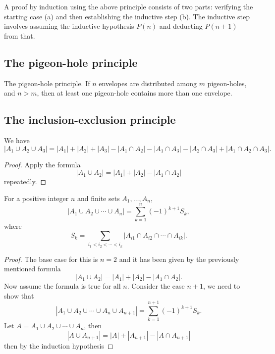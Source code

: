 \documentclass[10pt, a4paper]{article}
\begin{document}
A proof by induction using the above principle consists of two parts:
verifying the starting case (a) and then establishing the inductive step (b).
The inductive step involves assuming the inductive hypothesis $P(n)$ and deducting $P(n + 1)$ from that.

\subsection{The pigeon-hole principle}
The pigeon-hole principle.
If $n$ envelopes are distributed among $m$ pigeon-holes,
and $n > m$,
then at least one pigeon-hole contains more than one envelope.



\subsection{The inclusion-exclusion principle}

\begin{proposition}
    We have
    \[
    |A_1 \cup A_2 \cup A_3| = |A_1| + |A_2| + |A_3| - |A_1 \cap A_2| - |A_1 \cap A_3| - |A_2 \cap A_3| + |A_1 \cap A_2 \cap A_3|.
    \]
    \begin{proof}
        Apply the formula
        \[
        |A_1 \cup A_2| = |A_1| + |A_2| - |A_1 \cap A_2|
        \]
        repeatedly.
    \end{proof}
\end{proposition}

\begin{theorem}
    For a positive integer $n$ and finite sets $A_1, \dotsc, A_n$,
    \[
    |A_1 \cup A_2 \cup \dotsi \cup A_n| = \sum_{k = 1}^{n}(-1) ^ {k + 1}S_k,
    \]
    where
    \[
    S_k = \sum_{i_1 < i_2 < \dotsi < i_k}|A_{i1} \cap A_{i2} \cap \dotsi \cap A_{ik}|.
    \]
    \begin{proof}
        The base case for this is $n = 2$ and it has been given by the previously mentioned formula
        \[
        |A_1 \cup A_2| = |A_1| + |A_2| - |A_1 \cap A_2|.
        \]
        Now assume the formula is true for all $n$.
        Consider the case $n + 1$,
        we need to show that
        \[
        |A_1 \cup A_2 \cup \dotsi \cup A_n \cup A_{n + 1}| = \sum_{k = 1}^{n + 1}(-1) ^ {k + 1}S_k.
        \]
        Let $A = A_1 \cup A_2 \cup \dotsi \cup A_n$, then
        \[
        |A \cup A_{n + 1}| = |A| + |A_{n + 1}| - |A \cap A_{n + 1}|
        \]
        then by the induction hypothesis
        
    \end{proof}
\end{theorem}
\end{document}
